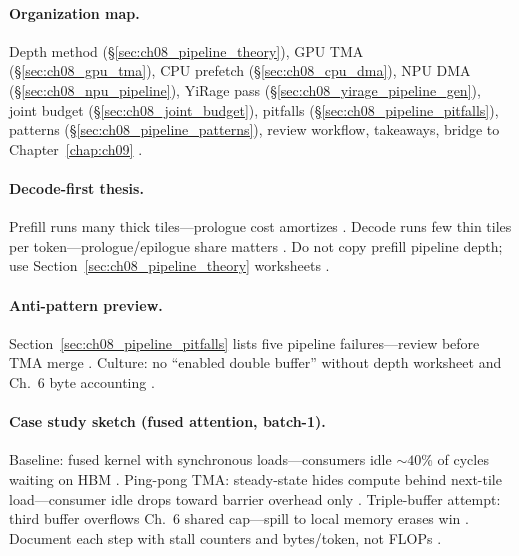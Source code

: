 \paragraph{Organization map.}
Depth method (\S\ref{sec:ch08_pipeline_theory}), GPU TMA (\S\ref{sec:ch08_gpu_tma}), CPU prefetch (\S\ref{sec:ch08_cpu_dma}), NPU DMA (\S\ref{sec:ch08_npu_pipeline}), YiRage pass (\S\ref{sec:ch08_yirage_pipeline_gen}), joint budget (\S\ref{sec:ch08_joint_budget}), pitfalls (\S\ref{sec:ch08_pipeline_pitfalls}), patterns (\S\ref{sec:ch08_pipeline_patterns}), review workflow, takeaways, bridge to Chapter~\ref{chap:ch09} \citep{semianalysis2024tma,patel2025llminference}.

\paragraph{Decode-first thesis.}
Prefill runs many thick tiles---prologue cost amortizes \citep{kwon2023vllm,shah2024flashattention3}.
Decode runs few thin tiles per token---prologue/epilogue share matters \citep{patel2025llminference,memoryfloor2026,taxbreak2026}.
Do not copy prefill pipeline depth; use Section~\ref{sec:ch08_pipeline_theory} worksheets \citep{yirage2026,dao2022flashattention}.

\paragraph{Anti-pattern preview.}
Section~\ref{sec:ch08_pipeline_pitfalls} lists five pipeline failures---review before TMA merge \citep{yirage2026,semianalysis2024tma}.
Culture: no ``enabled double buffer'' without depth worksheet and Ch.~6 byte accounting \citep{dao2022flashattention,chen2020compilerbasedhardw}.

\paragraph{Case study sketch (fused attention, batch-1).}
Baseline: fused kernel with synchronous loads---consumers idle ${\sim}40\%$ of cycles waiting on HBM \citep{shah2024flashattention3,memoryfloor2026,patel2025llminference}.
Ping-pong TMA: steady-state hides compute behind next-tile load---consumer idle drops toward barrier overhead only \citep{semianalysis2024tma,nvidia2022hopper}.
Triple-buffer attempt: third buffer overflows Ch.~6 shared cap---spill to local memory erases win \citep{yirage2026,dao2022flashattention,taxbreak2026}.
Document each step with stall counters and bytes/token, not FLOPs \citep{memoryfloor2026,chen2020compilerbasedhardw}.

